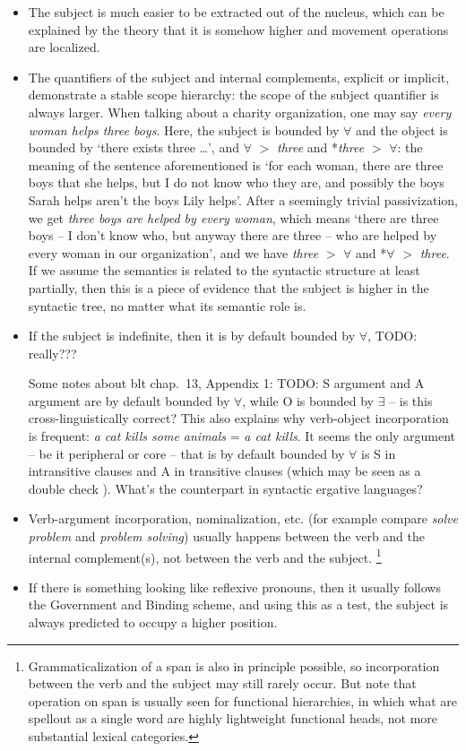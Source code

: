 \documentclass[UTF8, a4paper, oneside, scheme=plain]{ctexart}
\newcommand*{\citechap}[1]{chap.~{#1}}
\newcommand*{\corpus}[1]{\emph{#1}}
\begin{document}
\begin{itemize}
    \item The subject is much easier to be extracted out of the nucleus,
    which can be explained by the theory that 
    it is somehow higher and movement operations are localized.
    \item The quantifiers of the subject and internal complements, 
    explicit or implicit, 
    demonstrate a stable scope hierarchy:
    the scope of the subject quantifier is always larger.
    When talking about a charity organization,
    one may say \corpus{every woman helps three boys}.
    Here, the subject is bounded by $\forall$ and the object is bounded by `there exists three \dots',
    and $\forall$ $>$ \corpus{three} and *\corpus{three} $>$ $\forall$:
    the meaning of the sentence aforementioned is 
    `for each woman, there are three boys that she helps,
    but I do not know who they are,
    and possibly the boys Sarah helps aren't the boys Lily helps'.
    After a seemingly trivial passivization, 
    we get \corpus{three boys are helped by every woman},
    which means 
    `there are three boys -- I don't know who, but anyway there are three -- 
    who are helped by every woman in our organization',
    and we have \corpus{three} $>$ $\forall$ and *$\forall$ $>$ \corpus{three}.
    If we assume the semantics is related to the syntactic structure at least partially,
    then this is a piece of evidence that the subject is higher in the syntactic tree,
    no matter what its semantic role is. 
    \item If the subject is indefinite, then it is by default bounded by $\forall$, TODO: really???
    
    Some notes about \ac{blt} \citechap{13}, Appendix 1: 
    TODO: S argument and A argument are by default bounded by $\forall$,
    while O is bounded by $\exists$ -- is this cross-linguistically correct?
    This also explains why verb-object incorporation is frequent:
    \corpus{a cat kills some animals} = \corpus{a cat kills}.
    It seems the only argument -- be it peripheral or core -- 
    that is by default bounded by $\forall$ is S in intransitive clauses and A in transitive clauses
    (which may be seen as a double check ).
    What's the counterpart in syntactic ergative languages?
    \item Verb-argument incorporation, nominalization, etc. 
    (for example compare \corpus{solve problem} and \corpus{problem solving}) 
    usually happens between the verb and the internal complement(s),
    not between the verb and the subject.%
    \footnote{
        Grammaticalization of a span is also in principle possible,
        so incorporation between the verb and the subject 
        may still rarely occur.
        But note that operation on span is usually seen for functional hierarchies,
        in which what are spellout as a single word 
        are highly lightweight functional heads, 
        not more substantial lexical categories.
    }
    \item If there is something looking like reflexive pronouns, 
    then it usually follows the Government and Binding scheme,
    and using this as a test,
    the subject is always predicted to occupy a higher position.
\end{itemize}
\end{document}
